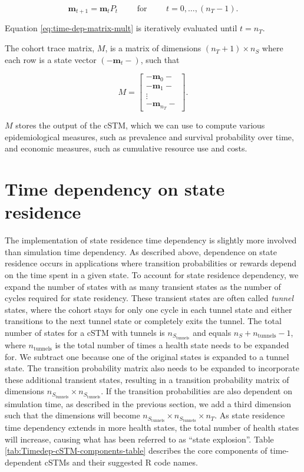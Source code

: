 \documentclass[
]{article}
\begin{document}
\begin{equation}
  \label{eq:time-dep-matrix-mult}
  \mathbf{m}_{t+1} = \mathbf{m}_{t} P_t \qquad\text{ for }\qquad t = 0,\ldots, (n_T - 1).
\end{equation}

Equation \eqref{eq:time-dep-matrix-mult} is iteratively evaluated until \(t = n_T\).

The cohort trace matrix, \(M\), is a matrix of dimensions \((n_T+1) \times n_S\) where each row is a state vector \((-\mathbf{m}_{t}-)\), such that

\[
  M = 
  \begin{bmatrix}
    - \mathbf{m}_0 -  \\
    - \mathbf{m}_1 -  \\
     \vdots \\
    - \mathbf{m}_{n_T} -  
  \end{bmatrix}. 
\]

\(M\) stores the output of the cSTM, which we can use to compute various epidemiological measures, such as prevalence and survival probability over time, and economic measures, such as cumulative resource use and costs.

\hypertarget{time-dependency-on-state-residence}{%
\section{Time dependency on state residence}\label{time-dependency-on-state-residence}}

The implementation of state residence time dependency is slightly more involved than simulation time dependency. As described above, dependence on state residence occurs in applications where transition probabilities or rewards depend on the time spent in a given state. To account for state residence dependency, we expand the number of states with as many transient states as the number of cycles required for state residency. These transient states are often called \emph{tunnel} states, where the cohort stays for only one cycle in each tunnel state and either transitions to the next tunnel state or completely exits the tunnel. The total number of states for a cSTM with tunnels is \(n_{S_\text{tunnels}}\) and equals \(n_S + n_{\text{tunnels}} - 1\), where \(n_{\text{tunnels}}\) is the total number of times a health state needs to be expanded for. We subtract one because one of the original states is expanded to a tunnel state. The transition probability matrix also needs to be expanded to incorporate these additional transient states, resulting in a transition probability matrix of dimensions \(n_{S_\text{tunnels}} \times n_{S_\text{tunnels}}\). If the transition probabilities are also dependent on simulation time, as described in the previous section, we add a third dimension such that the dimensions will become \(n_{S_\text{tunnels}} \times n_{S_\text{tunnels}} \times n_T\). As state residence time dependency extends in more health states, the total number of health states will increase, causing what has been referred to as ``state explosion''. Table \ref{tab:Timedep-cSTM-components-table} describes the core components of time-dependent cSTMs and their suggested R code names.
\end{document}
